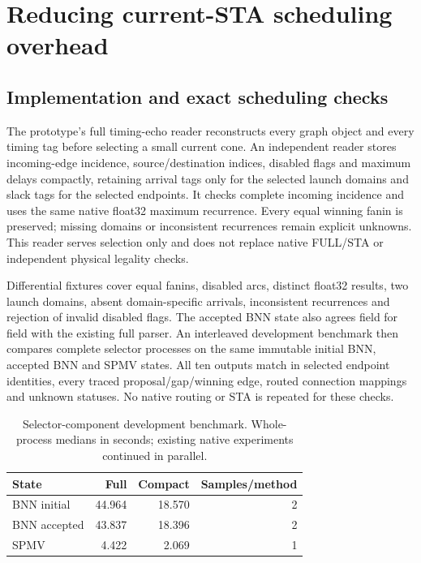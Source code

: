 
\section{Reducing current-STA scheduling overhead}
\subsection{Implementation and exact scheduling checks}
The prototype's full timing-echo reader reconstructs every graph object and every timing tag before selecting a small current cone. An independent reader stores incoming-edge incidence, source/destination indices, disabled flags and maximum delays compactly, retaining arrival tags only for the selected launch domains and slack tags for the selected endpoints. It checks complete incoming incidence and uses the same native float32 maximum recurrence. Every equal winning fanin is preserved; missing domains or inconsistent recurrences remain explicit unknowns. This reader serves selection only and does not replace native FULL/STA or independent physical legality checks.

Differential fixtures cover equal fanins, disabled arcs, distinct float32 results, two launch domains, absent domain-specific arrivals, inconsistent recurrences and rejection of invalid disabled flags. The accepted BNN state also agrees field for field with the existing full parser. An interleaved development benchmark then compares complete selector processes on the same immutable initial BNN, accepted BNN and SPMV states. All ten outputs match in selected endpoint identities, every traced proposal/gap/winning edge, routed connection mappings and unknown statuses. No native routing or STA is repeated for these checks.

\begin{table}[t]
\centering\small
\caption{Selector-component development benchmark. Whole-process medians in seconds; existing native experiments continued in parallel.}
\begin{tabular}{lrrr}
\hline
State & Full & Compact & Samples/method\\
\hline
BNN initial & 44.964 & 18.570 & 2\\
BNN accepted & 43.837 & 18.396 & 2\\
SPMV & 4.422 & 2.069 & 1\\
\hline
\end{tabular}
\end{table}

